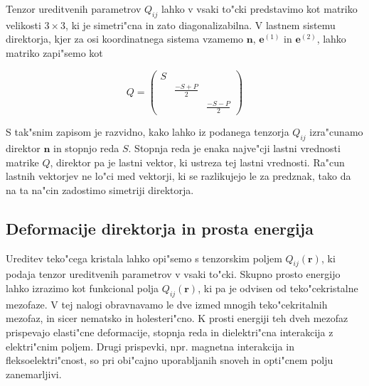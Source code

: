 \documentclass[a4paper,10pt]{article}
\renewcommand{\vec}{\mathbf}
\begin{document}
Tenzor ureditvenih parametrov $Q_{ij}$ lahko v vsaki to"cki predstavimo kot matriko velikosti $3\times 3$, ki je simetri"cna in zato diagonalizabilna. 
V lastnem sistemu direktorja, kjer za osi koordinatnega sistema vzamemo $\vec n$, $\vec e^{(1)}$ in $\vec e^{(2)}$, lahko matriko zapi"semo kot

\begin{equation}
 Q = \begin{pmatrix}
  S &   & \\
  & \frac{-S+P}{2} & \\
  & & \frac{-S-P}{2}
 \end{pmatrix}
\end{equation}

S tak"snim zapisom je razvidno, kako lahko iz podanega tenzorja $Q_{ij}$ izra"cunamo direktor $\vec n$ in stopnjo reda $S$. 
Stopnja reda je enaka najve"cji lastni vrednosti matrike $Q$, direktor pa je lastni vektor, ki ustreza tej lastni vrednosti. 
Ra"cun lastnih vektorjev ne lo"ci med vektorji, ki se razlikujejo le za predznak, tako da na ta na"cin zadostimo simetriji direktorja. 

\subsection{Deformacije direktorja in prosta energija}

Ureditev teko"cega kristala lahko opi"semo s tenzorskim poljem $Q_{ij}(\vec r)$, ki podaja tenzor ureditvenih parametrov v vsaki to"cki. 
Skupno prosto energijo lahko izrazimo kot funkcional polja $Q_{ij}(\vec r)$, ki pa je odvisen od teko"cekristalne mezofaze. 
V tej nalogi obravnavamo le dve izmed mnogih teko"cekritalnih mezofaz, in sicer nematsko in holesteri"cno. 
K prosti energiji teh dveh mezofaz prispevajo elasti"cne deformacije, stopnja reda in dielektri"cna interakcija z elektri"cnim poljem. 
Drugi prispevki, npr. magnetna interakcija in fleksoelektri"cnost, so pri obi"cajno uporabljanih snoveh in opti"cnem polju zanemarljivi.
\end{document}
